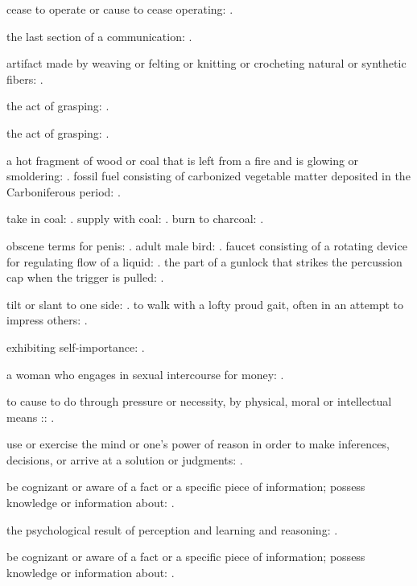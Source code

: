   cease to operate or cause to cease operating: .

  the last section of a communication: .

  artifact made by weaving or felting or knitting or crocheting natural or synthetic fibers: .

  the act of grasping: .

  the act of grasping: .

  a hot fragment of wood or coal that is left from a fire and is glowing or smoldering: . fossil fuel consisting of carbonized vegetable matter deposited in the Carboniferous period: .

  take in coal: . supply with coal: . burn to charcoal: .

  obscene terms for penis: . adult male bird: . faucet consisting of a rotating device for regulating flow of a liquid: . the part of a gunlock that strikes the percussion cap when the trigger is pulled: .

  tilt or slant to one side: . to walk with a lofty proud gait, often in an attempt to impress others: .

  exhibiting self-importance: .

  a woman who engages in sexual intercourse for money: .

  to cause to do through pressure or necessity, by physical, moral or intellectual means :: .

  use or exercise the mind or one's power of reason in order to make inferences, decisions, or arrive at a solution or judgments: .

  be cognizant or aware of a fact or a specific piece of information; possess knowledge or information about: .

  the psychological result of perception and learning and reasoning: .

  be cognizant or aware of a fact or a specific piece of information; possess knowledge or information about: .

